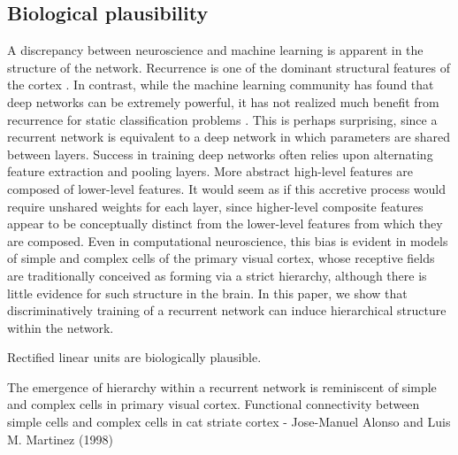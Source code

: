 \documentclass{article} %
\begin{document}
\subsection{Biological plausibility}

A discrepancy between neuroscience and machine learning is apparent in the structure of the network.  Recurrence is one of the dominant structural features of the cortex \cite{douglas2004}.  In contrast, while the machine learning community has found that deep networks can be extremely powerful, it has not realized much benefit from recurrence for static classification problems \cite{bengio2009}.  This is perhaps surprising, since a recurrent network is equivalent to a deep network in which parameters are shared between layers.  Success in training deep networks often relies upon alternating feature extraction and pooling layers.  More abstract high-level features are composed of lower-level features.  It would seem as if this accretive process would require unshared weights for each layer, since higher-level composite features appear to be conceptually distinct from the lower-level features from which they are composed.  Even in computational neuroscience, this bias is evident in models of simple and complex cells of the primary visual cortex, whose receptive fields are traditionally conceived as forming via a strict hierarchy, although there is little evidence for such structure in the brain.  In this paper, we show that discriminatively training of a recurrent network can induce hierarchical structure within the network.  %

Rectified linear units are biologically plausible.

The emergence of hierarchy within a recurrent network is reminiscent of simple and complex cells in primary visual cortex.  
Functional connectivity between simple cells and complex cells in cat striate cortex - Jose-Manuel Alonso and Luis M. Martinez (1998)
\end{document}
